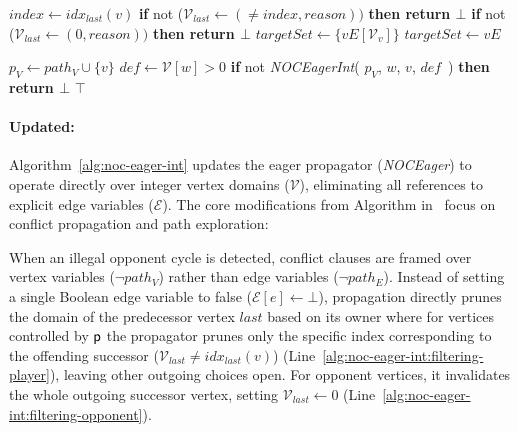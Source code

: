 \documentclass{article}
\begin{document}
\begin{appendices}
\begin{algorithm}[htb]
\begin{algorithmic}[1]
             \label{alg:noc-eager-int:filtering}
            \STATE $index \gets \textit{idx}_{\textit{last}}(v)$
            \STATE \textbf{if }not ($\mathcal{V}_{\textit{last}} \gets (\neq index, \textit{reason}))$ \textbf{then return $\bot$} \label{alg:noc-eager-int:filtering-player}
            \ELSE
                \STATE \textbf{if }not ($\mathcal{V}_{\textit{last}} \gets (0, \textit{reason}))$ \textbf{then return $\bot$} \label{alg:noc-eager-int:filtering-opponent}
            \ENDIF
        \ENDIF
     \label{alg:noc-eager-int:defcheck}
            \STATE $\textit{targetSet} \gets \{vE[\mathcal{V}_v]\}$ \label{alg:noc-eager-int:traversal-player}
        \ELSE
            \STATE $\textit{targetSet} \gets vE$ \label{alg:noc-eager-int:traversal-opponent}
        \ENDIF

         \label{alg:noc-eager-int:edgecheck}
            \STATE $p_V \gets path_V \cup \{v\}$
            \STATE $\textit{def} \gets \mathcal{V}[w] > 0$ \label{alg:noc-eager-int:def}
            \STATE \textbf{if }not \textit{NOCEagerInt}(
                $p_V$,
                $w$,
                $v$,
                $\textit{def}$\ ) \textbf{then return $\bot$}
        \ENDFOR
    \ENDIF
    \RETURN $\top$
\end{algorithmic}
\label{alg:noc-eager-int}
\end{algorithm}

\paragraph{\nooppc Updated:}

Algorithm~\ref{alg:noc-eager-int} updates the eager propagator (\textit{NOCEager}) to operate directly over integer vertex domains ($\mathcal{V}$), eliminating all references to explicit edge variables ($\mathcal{E}$). The core modifications from Algorithm \noceager in~\cite{Hernandez:2026:noc} focus on conflict propagation and path exploration:

When an illegal opponent cycle is detected, conflict clauses are framed over vertex variables ($\neg path_V$) rather than edge variables ($\neg path_E$). Instead of setting a single Boolean edge variable to false ($\mathcal{E}[e] \gets \bot$), propagation directly prunes the domain of the predecessor vertex $\textit{last}$ based on its owner where for vertices controlled by $\mathsf{p}$ the propagator prunes only the specific index corresponding to the offending successor ($\mathcal{V}_{\textit{last}} \neq \textit{idx}_{\textit{last}}(v)$) (Line~\ref{alg:noc-eager-int:filtering-player}), leaving other outgoing choices open. For opponent vertices, it invalidates the whole outgoing successor vertex, setting $\mathcal{V}_{\textit{last}} \gets 0$ (Line~\ref{alg:noc-eager-int:filtering-opponent}).


\end{appendices}
\end{document}
